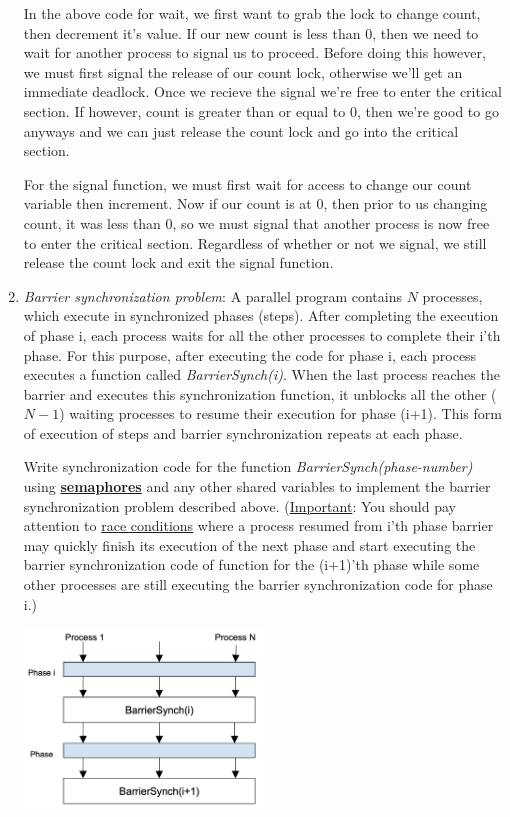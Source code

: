 \documentclass[11pt]{article}
\newcommand{\n}{\vspace{0.3cm}}
\begin{document}
\begin{enumerate}
    In the above code for wait, we first want to grab the lock to change count, then decrement it's value.  If our new count is less than 0, then we need to wait for another process to signal us to proceed.  Before doing this however, we must first signal the release of our count lock, otherwise we'll get an immediate deadlock.  Once we recieve the signal we're free to enter the critical section.  If however, count is greater than or equal to 0, then we're good to go anyways and we can just release the count lock and go into the critical section. \n

    For the signal function, we must first wait for access to change our count variable then increment.  Now if our count is at 0, then prior to us changing count, it was less than 0, so we must signal that another process is now free to enter the critical section.  Regardless of whether or not we signal, we still release the count lock and exit the signal function.
    \newpage

  \item \textit{Barrier synchronization problem}: A parallel program contains \(N\) processes, which execute in synchronized phases (steps).  After completing the execution of phase i, each process waits for all the other processes to complete their i’th phase. For this purpose, after executing the code for phase i, each process executes a function called \textit{BarrierSynch(i)}.  When the last process reaches the barrier and executes this synchronization function, it unblocks all the other (\(N-1\)) waiting processes to resume their execution for phase (i+1). This form of execution of steps and barrier synchronization repeats at each phase.

    Write synchronization code for the function \textit{BarrierSynch(phase-number)} using \textbf{\ul{semaphores}} and any other shared variables to implement the barrier synchronization problem described above.  (\ul{Important}: You should pay attention to \ul{race conditions} where a process resumed from i’th phase barrier may quickly finish its execution of the next phase and start executing the barrier synchronization code of function for the (i+1)’th phase while some other processes are still executing the barrier synchronization code for phase i.)

    \begin{center}
      \includegraphics[width=0.5\textwidth]{barrier-sync.png}
    \end{center}


\end{enumerate}
\end{document}

